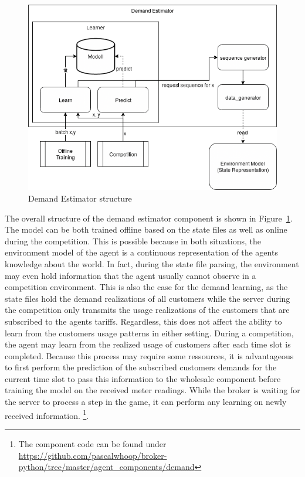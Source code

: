 {\begin{figure}[h] \centering \includegraphics[width=0.8\linewidth]{img/UsageEstimator.png} \caption{Demand Estimator
structure} \label{fig:DemandEstimator} \end{figure}


The overall structure of the demand estimator component is shown in Figure~\ref{fig:DemandEstimator}. The model can be
both trained offline based on the state files as well as online during the competition. This is possible because in both
situations, the environment model of the agent is a continuous representation of the agents knowledge about the world.
In fact, during the state file parsing, the environment may even hold information that the agent usually cannot observe
in a competition environment. This is also the case for the demand learning, as the state files hold the demand
realizations of all customers while the server during the competition only transmits the usage realizations of the
customers that are subscribed to the agents tariffs. Regardless, this does not affect the ability to learn from the
customers usage patterns in either setting. During a competition, the agent may learn from the realized usage of
customers after each time slot is completed. Because this process may require some ressources, it is advantageous to
first perform the prediction of the subscribed customers demands for the current time slot to pass this information to
the wholesale component before training the model on the received meter readings. While the broker is waiting for the
server to process a step in the game, it can perform any learning on newly received information. \footnote{The component code can be
found under \url{https://github.com/pascalwhoop/broker-python/tree/master/agent_components/demand}}.

}

